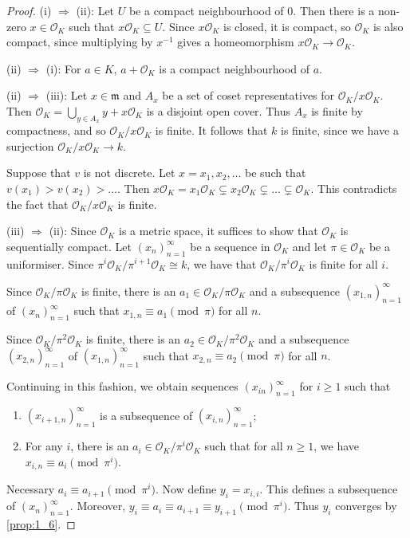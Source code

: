 \documentclass[11pt]{article}
\theoremstyle{definition}
\theoremstyle{plain}
\theoremstyle{remark}
\newcommand{\cO}{\mathcal{O}}
\newcommand{\fm}{\mathfrak{m}}
\begin{document}
\begin{proof}
    (i) $\Rightarrow$ (ii): Let $U$ be a compact neighbourhood of $0$. Then there is a non-zero $x \in \cO_K$ such that $x \cO_K \subseteq U$. Since $x \cO_K$ is closed, it is compact, so $\cO_K$ is also compact, since multiplying by $x^{-1}$ gives a homeomorphism $x \cO_K \to \cO_K$.

    \noindent (ii) $\Rightarrow$ (i): For $a \in K$, $a + \cO_K$ is a compact neighbourhood of $a$.

    \noindent (ii) $\Rightarrow$ (iii): Let $x \in \fm$ and $A_x$ be a set of coset representatives for $\cO_K / x \cO_K$. Then $\cO_K = \bigcup_{y \in A_x} y + x \cO_K$ is a disjoint open cover. Thus $A_x$ is finite by compactness, and so $\cO_K / x \cO_K$ is finite. It follows that $k$ is finite, since we have a surjection $\cO_K / x \cO_K \to k$.

    Suppose that $v$ is not discrete. Let $x = x_1, x_2, \ldots$ be such that $v(x_1) > v(x_2) > \ldots$. Then $x \cO_K = x_1 \cO_K \subsetneq x_2 \cO_K \subsetneq \ldots \subsetneq \cO_K$. This contradicts the fact that $\cO_K / x \cO_K$ is finite.

    \noindent (iii) $\Rightarrow$ (ii): Since $\cO_K$ is a metric space, it suffices to show that $\cO_K$ is sequentially compact. Let $(x_n)_{n=1}^\infty$ be a sequence in $\cO_K$ and let $\pi \in \cO_K$ be a uniformiser. Since $\pi^i \cO_K / \pi^{i+1} \cO_K \cong k$, we have that $\cO_K / \pi^i \cO_K$ is finite for all $i$.

    Since $\cO_K/\pi \cO_K$ is finite, there is an $a_1 \in \cO_K/\pi \cO_K$ and a subsequence $(x_{1,n})_{n=1}^\infty$ of $(x_n)_{n=1}^\infty$ such that $x_{1,n} \equiv a_1 \pmod{\pi}$ for all $n$.

    Since $\cO_K/\pi^2 \cO_K$ is finite, there is an $a_2 \in \cO_K/\pi^2 \cO_K$ and a subsequence $(x_{2,n})_{n=1}^\infty$ of $(x_{1,n})_{n=1}^\infty$ such that $x_{2,n} \equiv a_2 \pmod{\pi}$ for all $n$.

    Continuing in this fashion, we obtain sequences $(x_{in})_{n=1}^\infty$ for $i \ge 1$ such that
    \begin{enumerate}
        \item $(x_{i+1, n})_{n=1}^\infty$ is a subsequence of $(x_{i, n})_{n=1}^\infty$;
        \item For any $i$, there is an $a_i \in \cO_K / \pi^i \cO_K$ such that for all $n \ge 1$, we have $x_{i,n} \equiv a_i \pmod{\pi^i}$.
    \end{enumerate}
    Necessary $a_i \equiv a_{i+1} \pmod{\pi^i}$. Now define $y_i = x_{i,i}$. This defines a subsequence of $(x_n)_{n=1}^\infty$. Moreover, $y_i \equiv a_i \equiv a_{i+1} \equiv y_{i+1} \pmod{\pi^i}$. Thus $y_i$ converges by \autoref{prop:1_6}.
\end{proof}
\end{document}
